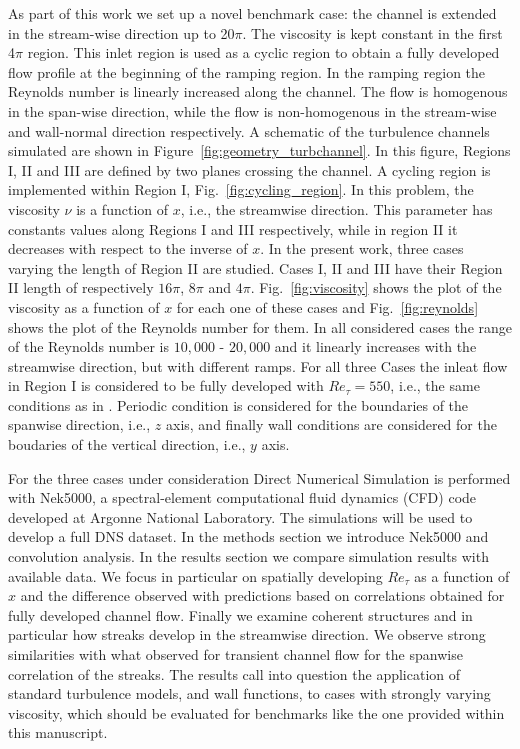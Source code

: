\documentclass[twocolumn,10pt]{asme2e}
\begin{document}
As part of this work we set up a novel benchmark case: the channel is extended in the stream-wise direction up to 20\(\pi\). The viscosity is kept constant in the first 4\(\pi\) region. This inlet region is used as a cyclic region to obtain a fully developed flow profile at the beginning of the ramping region. In the ramping region the Reynolds number is linearly increased along the channel. The flow is homogenous in the span-wise direction, while the flow is non-homogenous in the stream-wise and wall-normal direction respectively.  A schematic of the turbulence channels simulated are shown in Figure~\ref{fig:geometry_turbchannel}. In this figure, Regions I, II and III are defined by two planes crossing the channel. A cycling region is implemented within Region I, Fig.~\ref{fig:cycling_region}. In this problem, the viscosity \(\nu\) is a function of \(x\), i.e., the streamwise direction. This parameter has constants values along Regions I and III respectively, while in region II it decreases with respect to the inverse of \(x\). In the present work, three cases varying the length of Region II are studied. Cases I, II and III have their Region II length of respectively \(16\pi\), \(8\pi\) and \(4\pi\). Fig.~\ref{fig:viscosity} shows the plot of the viscosity as a function of \(x\) for each one of these cases and Fig.~\ref{fig:reynolds} shows the plot of the Reynolds number for them. In all considered cases the range of the Reynolds number is \(10,000\) - \(20,000\) and it linearly increases with the streamwise direction, but with different ramps. For all three Cases the inleat flow in Region I is considered to be fully developed with \(Re_{\tau}=550\), i.e., the same conditions as in \cite{hoyas2008}. Periodic condition is considered for the boundaries of the spanwise direction, i.e., \(z\) axis, and finally wall conditions are considered for the boudaries of the vertical direction, i.e., \(y\) axis.

For the three cases under consideration Direct Numerical Simulation is performed with Nek5000, a spectral-element computational fluid dynamics (CFD) code developed at Argonne National Laboratory. The simulations will be used to develop a full DNS dataset. In the methods section we introduce Nek5000 and convolution analysis. In the results section we compare simulation results with available data. We focus in particular on spatially developing $Re_{\tau}$ as a function of $x$ and the difference observed with predictions based on correlations obtained for fully developed channel flow. Finally we examine coherent structures and in particular how streaks develop in the streamwise direction. We observe strong similarities with what observed for transient channel flow for the spanwise correlation of the streaks. The results call into question the application of standard turbulence models, and wall functions, to cases with strongly varying viscosity, which should be evaluated for benchmarks like the one provided within this manuscript.
\end{document}
